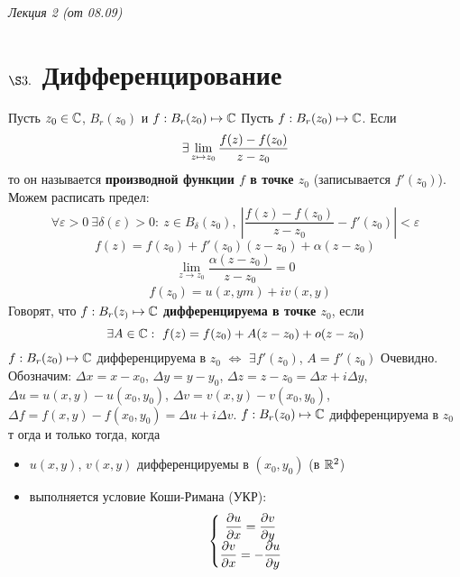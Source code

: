 \begin{flushright}
    \textit{Лекция 2 (от 08.09)}
\end{flushright}
\section{$\S 3.$ Дифференцирование}
Пусть $z_0 \in \mathbb{C}$, $B_r(z_0)$ и $f: B_r(z_0) \mapsto \mathbb{C}$
\Def
Пусть $f: B_r(z_0) \mapsto \mathbb{C}$. Если
\begin{equation}\label{(3.1)}
    \exists \displaystyle \lim_{z \mapsto z_0} \frac{f(z)-f(z_0)}{z-z_0}
\end{equation}
то он называется \textbf{производной функции $f$ в точке $z_0$} (записывается
$f'(z_0)$).
\\
Можем расписать предел:
\begin{equation}\label{(3.2)}
    \forall \varepsilon > 0 \ \exists \delta(\varepsilon)>0: \ z \in B_\delta(z_0), \ \left| \frac{f(z) - f(z_0)}{z-z_0} - f'(z_0) \right| < \varepsilon
\end{equation}
\begin{equation}\label{(3.3)}
    f(z) = f(z_0) + f'(z_0)(z-z_0) + \alpha(z-z_0)
\end{equation}
\begin{equation}\label{(3.4)}
    \lim_{z \to z_0}\frac{\alpha(z-z_0)}{z-z_0} = 0
\end{equation}
\begin{align*}
  & f(z_0) = u(x,ym) + iv(x,y)
\end{align*}
\Def
Говорят, что $f: B_r(z_) \mapsto \mathbb{C}$ \textbf{дифференцируема в точке $z_0$},
если
\begin{equation}\label{(3.5)}
    \exists A \in \mathbb{C}: \ f(z) = f(z_0)+A(z-z_0)+o(z-z_0)
\end{equation}
\lemma
$f: B_r(z_0) \mapsto \mathbb{C}$ дифференцируема в $z_0$ $\Leftrightarrow$ $\exists
f'(z_0)$, $A = f'(z_0)$
\pr
Очевидно.
\\
Обозначим: $\Delta x = x-x_0$, $\Delta y = y - y_0$, $\Delta z = z-z_0 = \Delta
x + i \Delta y$, $\Delta u = u(x,y)-u(x_0,y_0)$, $\Delta v = v(x,y)-v(x_0,y_0)$,
$\Delta f = f(x,y)-f(x_0,y_0) = \Delta u + i \Delta v$.
\theorem
$f: B_r(z_0) \mapsto \mathbb{C}$ дифференцируема в $z_0$ т огда и только тогда, когда
\begin{itemize}
    \item $u(x,y)$, $v(x,y)$ дифференцируемы в $(x_0,y_0)$ (в $\mathbb{R}^2$)
    \item выполняется условие Коши-Римана (УКР):
    \begin{equation}\label{(3.6)}
        \left\{ \begin{matrix}
                \displaystyle \frac{\partial u}{\partial x} = \displaystyle \frac{\partial v}{\partial y} \\
                \displaystyle \frac{\partial v}{\partial x} = - \displaystyle \frac{\partial u}{\partial y}
            \end{matrix} \right.
    \end{equation}
\end{itemize}
